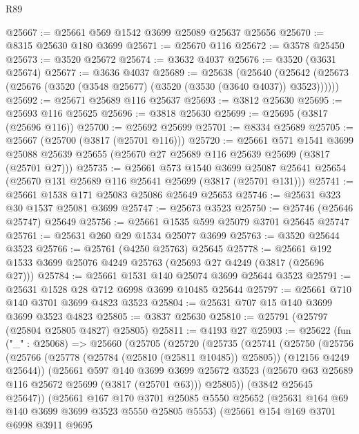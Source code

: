 \begin{lexlean}{R89}
\begin{coremodule}
@25667 := @25661 @569 @1542 @3699 @25089 @25637 @25656
@25670 := @8315 @25630 @180 @3699
@25671 := @25670 @116
@25672 := @3578 @25450
@25673 := @3520 @25672
@25674 := @3632 @4037
@25676 := @3520 (@3631 @25674)
@25677 := @3636 @4037
@25689 := @25638
    (@25640 (@25642 (@25673 (@25676 (@3520 (@3548 @25677) (@3520 (@3530 (@3640 @4037)) @3523))))))
@25692 := @25671 @25689 @116 @25637
@25693 := @3812 @25630
@25695 := @25693 @116 @25625
@25696 := @3818 @25630
@25699 := @25695 (@3817 (@25696 @116))
@25700 := @25692 @25699
@25701 := @8334 @25689
@25705 := @25667 (@25700 (@3817 (@25701 @116)))
@25720 := @25661
    @571
    @1541
    @3699
    @25088
    @25639
    @25655
    (@25670 @27 @25689 @116 @25639 @25699 (@3817 (@25701 @27)))
@25735 := @25661
    @573
    @1540
    @3699
    @25087
    @25641
    @25654
    (@25670 @131 @25689 @116 @25641 @25699 (@3817 (@25701 @131)))
@25741 := @25661 @1538 @171 @25083 @25086 @25649 @25653
@25746 := @25631 @323 @30 @1537 @25081 @3699
@25747 := @25673 @3523
@25750 := @25746 (@25646 @25747) @25649
@25756 := @25661 @1535 @599 @25079 @3701 @25645 @25747
@25761 := @25631 @260 @29 @1534 @25077 @3699
@25763 := @3520 @25644 @3523
@25766 := @25761 (@4250 @25763) @25645
@25778 := @25661 @192 @1533 @3699 @25076 @4249 @25763 (@25693 @27 @4249 (@3817 (@25696 @27)))
@25784 := @25661 @1531 @140 @25074 @3699 @25644 @3523
@25791 := @25631 @1528 @28 @712 @6998 @3699 @10485 @25644
@25797 := @25661 @710 @140 @3701 @3699 @4823 @3523
@25804 := @25631 @707 @15 @140 @3699 @3699 @3523 @4823
@25805 := @3837 @25630
@25810 := @25791 (@25797 (@25804 @25805 @4827) @25805)
@25811 := @4193 @27
@25903 := @25622
    (fun ("_" : @25068) =>
    @25660
      (@25705
        (@25720
          (@25735
            (@25741
              (@25750
                (@25756
                  (@25766 (@25778 (@25784 (@25810 (@25811 @10485)) @25805)) (@12156 @4249 @25644))
                  (@25661
                    @597
                    @140
                    @3699
                    @3699
                    @25672
                    @3523
                    (@25670 @63 @25689 @116 @25672 @25699 (@3817 (@25701 @63)))
                    @25805))
                (@3842 @25645 @25647))
              (@25661
                @167
                @170
                @3701
                @25085
                @5550
                @25652
                (@25631 @164 @69 @140 @3699 @3699 @3523 @5550 @25805 @5553)
                (@25661
                  @154
                  @169
                  @3701
                  @6998
                  @3911
                  @9695

\end{coremodule}
\end{lexlean}
